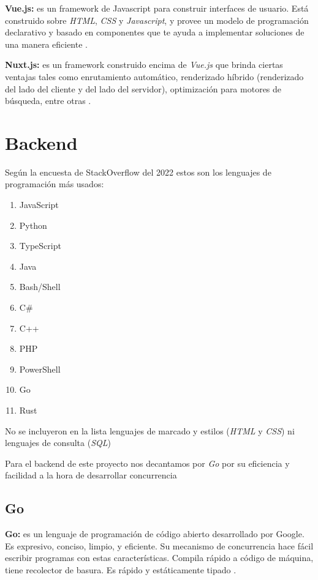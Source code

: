 \textbf{Vue.js:} es un framework de Javascript para construir interfaces de usuario. Está construido sobre \textit{HTML}, \textit{CSS} y \textit{Javascript}, y provee un modelo de programación declarativo y basado en componentes que te ayuda a implementar soluciones de una manera eficiente \cite{vue}.
\newline

\textbf{Nuxt.js:} es un framework construido encima de \textit{Vue.js} que brinda ciertas ventajas tales como enrutamiento automático, renderizado híbrido (renderizado del lado del cliente y del lado del servidor), optimización para motores de búsqueda, entre otras \cite{nuxt}.

\section{Backend}
Según la encuesta de StackOverflow del 2022 \cite{encuesta2022} estos son los lenguajes de programación más usados: 
\begin{enumerate}
	\item JavaScript
	\item Python
	\item TypeScript
	\item Java
	\item Bash/Shell
	\item C#
	\item C++
	\item PHP
	\item PowerShell
	\item Go
	\item Rust
\end{enumerate}
No se incluyeron en la lista lenguajes de marcado y estilos (\textit{HTML} y \textit{CSS}) ni lenguajes de consulta (\textit{SQL})
\newline

Para el backend de este proyecto nos decantamos por \textit{Go} por su eficiencia y facilidad a la hora de desarrollar concurrencia
\subsection{Go}
\textbf{Go:} es un lenguaje de programación de código abierto desarrollado por Google. Es expresivo, conciso, limpio, y eficiente. Su mecanismo de concurrencia hace fácil escribir programas con estas características. Compila rápido a código de máquina, tiene recolector de basura. Es rápido y estáticamente tipado \cite{golang}.
\newline

